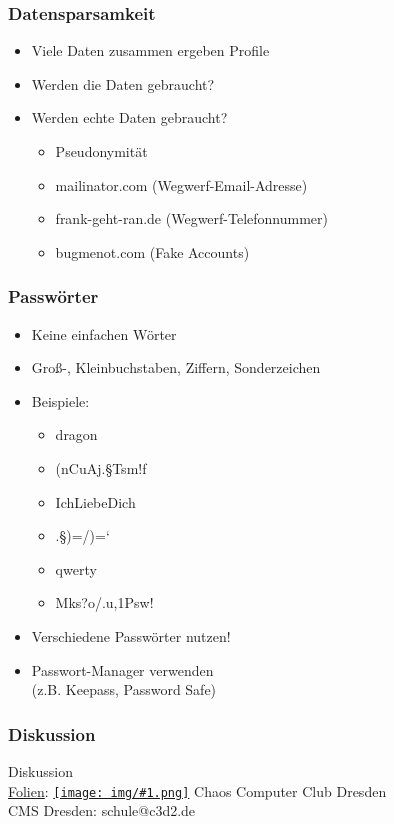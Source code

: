 \documentclass[12pt]{beamer}
\newcommand{\cc}[1]{\texttt{[image: img/\#1.png]}\hspace{1mm}}
\begin{document}
\begin{frame}
    \frametitle{Datensparsamkeit}
    \begin{itemize}
        \item<2-> Viele Daten zusammen ergeben Profile
        \item<3-> Werden die Daten gebraucht?
        \item<4-> Werden echte Daten gebraucht?
            \begin{itemize}
              \item<5-> Pseudonymität
              \item<6-> mailinator.com (Wegwerf-Email-Adresse)
              \item<7-> frank-geht-ran.de (Wegwerf-Telefonnummer)
              \item<8-> bugmenot.com (Fake Accounts)
            \end{itemize}
    \end{itemize}
\end{frame}

\begin{frame}
    \frametitle{Passwörter}
    \begin{itemize}
        \item<2-> Keine einfachen Wörter
        \item<3-> Groß-, Kleinbuchstaben, Ziffern, Sonderzeichen
        \item<4-> Beispiele:
            \begin{itemize}
                \item<5-> dragon
                \item<6-> (nCuAj.§Tsm!f
                \item<7-> IchLiebeDich
                \item<8-> .§)=/)=`
                \item<9-> qwerty
                \item<10-> Mks?o/.u,1Psw!
            \end{itemize}
        \item<12-> Verschiedene Passwörter nutzen!
        \item<13-> Passwort-Manager verwenden \\ (z.B. Keepass, Password Safe)
    \end{itemize}
\end{frame}

\begin{frame}
  \frametitle{Diskussion}
  \begin{center}
    {\Large Diskussion}\\
    \vspace{5mm}
    \href{https://github.com/c3d2/cms-nsa}{Folien}: \href{https://creativecommons.org/licenses/by-sa/4.0/}{\cc{by-sa}} Chaos Computer Club Dresden \\
    \vspace{4mm}
    CMS Dresden: schule@c3d2.de
  \end{center}
\end{frame}
\end{document}

